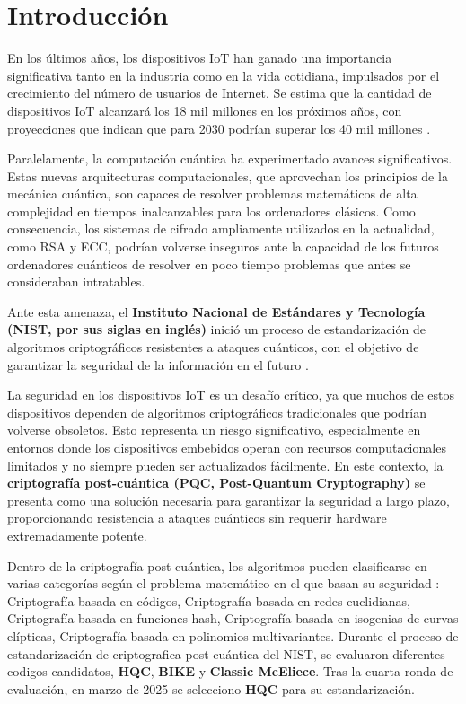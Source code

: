 %
\chapter{Introducción}
\label{ch::chapter1}
En los últimos años, los dispositivos IoT han ganado una importancia significativa tanto en la industria
como en la vida cotidiana, impulsados por el crecimiento del número de usuarios de Internet. Se estima 
que la cantidad de dispositivos IoT alcanzará los 18 mil millones en los próximos años, con proyecciones
que indican que para 2030 podrían superar los 40 mil millones \cite{kumar_how_2024}.

Paralelamente, la computación cuántica ha experimentado avances significativos. Estas nuevas 
arquitecturas computacionales, que aprovechan los principios de la mecánica cuántica, son capaces de 
resolver problemas matemáticos de alta complejidad en tiempos inalcanzables para los ordenadores clásicos. 
Como consecuencia, los sistemas de cifrado ampliamente utilizados en la actualidad, como RSA y ECC, 
podrían volverse inseguros ante la capacidad de los futuros ordenadores cuánticos de resolver en poco 
tiempo problemas que antes se consideraban intratables.

Ante esta amenaza, el \textbf{Instituto Nacional de Estándares y Tecnología (NIST, por sus siglas en inglés)} 
inició un proceso de estandarización de algoritmos criptográficos resistentes a ataques cuánticos, 
con el objetivo de garantizar la seguridad de la información en el futuro \cite{computer_security_division_post-quantum_2017}.

La seguridad en los dispositivos IoT es un desafío crítico, ya que muchos de estos dispositivos dependen 
de algoritmos criptográficos tradicionales que podrían volverse obsoletos. Esto representa un riesgo 
significativo, especialmente en entornos donde los dispositivos embebidos operan con recursos computacionales 
limitados y no siempre pueden ser actualizados fácilmente. En este contexto, la \textbf{criptografía post-cuántica (PQC, Post-Quantum Cryptography)} 
se presenta como una solución necesaria para garantizar la seguridad a largo plazo, proporcionando 
resistencia a ataques cuánticos sin requerir hardware extremadamente potente.

Dentro de la criptografía post-cuántica, los algoritmos pueden clasificarse en varias categorías según 
el problema matemático en el que basan su seguridad \cite{fernandez-carames_pre-quantum_2020}: Criptografía 
basada en códigos, Criptografía basada en redes euclidianas, Criptografía basada en funciones hash, 
Criptografía basada en isogenias de curvas elípticas, Criptografía basada en polinomios multivariantes.
Durante el proceso de estandarización de criptografica post-cuántica del NIST, se evaluaron diferentes
codigos candidatos, \textbf{HQC}, \textbf{BIKE} y \textbf{Classic McEliece}. Tras la cuarta ronda de 
evaluación, en marzo de 2025 se selecciono \textbf{HQC} para su estandarización.

